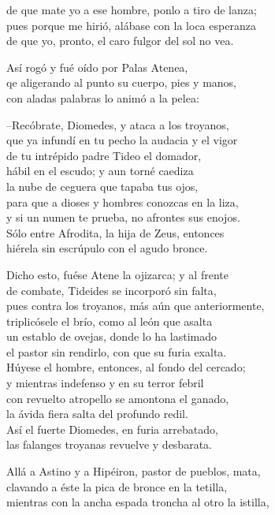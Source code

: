\documentclass[11pt,twoside]{article}
\begin{document}
de que mate yo a ese hombre, ponlo a tiro de lanza;\\
pues porque me hirió, alábase con la loca esperanza\\
de que yo, pronto, el caro fulgor del sol no vea.\par
Así rogó y fué oído por Palas Atenea,\\
qe aligerando al punto su cuerpo, pies y manos,\\
con aladas palabras lo animó a la pelea:\par
--Recóbrate, Diomedes, y ataca a los troyanos,\\
que ya infundí en tu pecho la audacia y el vigor\\
de tu intrépido padre Tideo el domador,\\
hábil en el escudo; y aun torné caediza\\
la nube de ceguera que tapaba tus ojos,\\
para que a dioses y hombres conozcas en la liza,\\
y si un numen te prueba, no afrontes sus enojos.\\
Sólo entre Afrodita, la hija de Zeus, entonces\\
hiérela sin escrúpulo con el agudo bronce.\par
Dicho esto, fuése Atene la ojizarca; y al frente\\
de combate, Tideides se incorporó sin falta,\\
pues contra los troyanos, más aún que anteriormente,\\
triplicósele el brío, como al león que asalta\\
un establo de ovejas, donde lo ha lastimado\\
el pastor sin rendirlo, con que su furia exalta.\\
Húyese el hombre, entonces, al fondo del cercado;\\
y mientras indefenso y en su terror febril\\
con revuelto atropello se amontona el ganado,\\
la ávida fiera salta del profundo redil.\\
Así el fuerte Diomedes, en furia arrebatado,\\
las falanges troyanas revuelve y desbarata.\par
Allá a Astino y a Hipéiron, pastor de pueblos, mata,\\
clavando a éste la pica de bronce en la tetilla,\\
mientras con la ancha espada troncha al otro la istilla,\\
\end{document}
